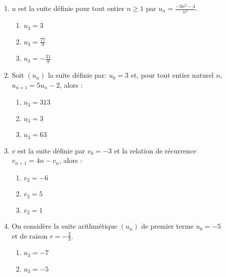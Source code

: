 \documentclass[oneside,twocolumn,landscape]{book}
\begin{document}
\begin{enumerate}
\item $u$ est la suite définie pour tout entier $n \geqslant 1$ par $u_{n}=\frac{-3n^{2}-4}{n^{2}}$.

\begin{enumerate}

\item\MauvaiseReponse $u_{3}=3$


\item\MauvaiseReponse $u_{3} =\frac{77}{9}$
\item\BonneReponse $u_{3}=-\frac{31}{9}$

\end{enumerate}


\item Soit $\left(u_{n}\right)$ la suite définie par: $u_{0}=3$ et, pour tout entier naturel $n$, $u_{n+1}=5 u_{n}-2$, alors :

\begin{enumerate}

\item\BonneReponse $u_{3}=313$
\item\MauvaiseReponse $u_{3}=3$

\item\MauvaiseReponse $u_{3}=63$


\end{enumerate}

\newpage

\item $v$ est la suite définie par $v_{0}=-3$ et la relation de récurrence\\ $v_{n+1}=4n-v_{n}$, alors :

\begin{enumerate}


\item\MauvaiseReponse $v_{2}=-6$

\item\MauvaiseReponse $v_{2}=5$
\item\BonneReponse $v_{2}=1$

\end{enumerate}



\item On considère la suite arithmétique $\left(u_{n}\right)$ de premier terme $u_{0}=-5$\\ et de raison $r=-\frac{2}{3}$.

\begin{enumerate}

\item\BonneReponse $u_{3}=-7$
\item\MauvaiseReponse $u_{3}=-5$


\end{enumerate}
\end{enumerate}
\end{document}
